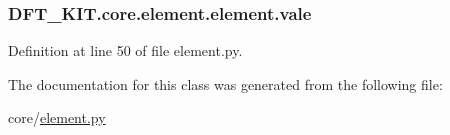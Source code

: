 \hypertarget{class_d_f_t___k_i_t_1_1core_1_1element_1_1element_af0b4a1138ddc637879efb7f1dfc96630}{
\subsubsection[{vale}]{\setlength{\rightskip}{0pt plus 5cm}D\+F\+T\+\_\+\+K\+I\+T.\+core.\+element.\+element.\+vale}}\label{class_d_f_t___k_i_t_1_1core_1_1element_1_1element_af0b4a1138ddc637879efb7f1dfc96630}


Definition at line 50 of file element.\+py.



The documentation for this class was generated from the following file\+:\begin{DoxyCompactItemize}
\item 
core/\hyperlink{element_8py}{element.\+py}\end{DoxyCompactItemize}
